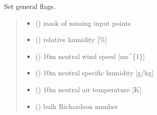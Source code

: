\documentclass[letterpaper,10pt,english]{sphinxmanual}
\begin{document}
\begin{fulllineitems}
\label{\detokenize{users_guide:AirSeaFluxCode.util_subs.set_flag}}
\pysigstartsignatures
{}
\pysigstopsignatures
\sphinxAtStartPar
Set general flags.
\begin{quote}\begin{description}
\begin{itemize}
\item {} 
\sphinxAtStartPar
{} () \textendash{} mask of missing input points

\item {} 
\sphinxAtStartPar
{} () \textendash{} relative humidity             {[}\%{]}

\item {} 
\sphinxAtStartPar
{} () \textendash{} 10m neutral wind speed        {[}ms\textasciicircum{}\{\sphinxhyphen{}1\}{]}

\item {} 
\sphinxAtStartPar
{} () \textendash{} 10m neutral specific humidity {[}g/kg{]}

\item {} 
\sphinxAtStartPar
{} () \textendash{} 10m neutral air temperature   {[}K{]}

\item {} 
\sphinxAtStartPar
{} () \textendash{} bulk Richardson number


\end{itemize}
\end{description}
\end{quote}
\end{fulllineitems}
\end{document}
